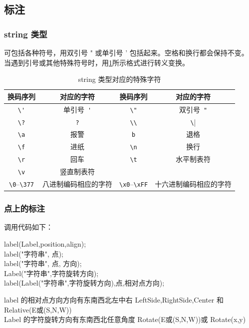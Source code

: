 \subsection{标注}
\subsubsection{string 类型}
可包括各种符号，用双引号 " 或单引号 ' 包括起来。空格和换行都会保持不变。
当遇到引号或其他特殊符号时，用\ref{markcode}所示格式进行转义变换。
\begin{table}[htb]
\centering
 \caption{ string 类型对应的特殊字符}\label{markcode}
 \begin{tabular}{cc|cc}
  \toprule
    \textbf{换码序列} & \textbf{对应的字符} & \textbf{换码序列} &
    \textbf{对应的字符}\\\midrule
    \verb|\'| & 单引号~\verb|'| & \verb|\"| & 双引号~\verb|"| \\
    \verb|\?| & \verb|?| & \verb|\\| & \verb|\| \\
    \verb|\a| & 报警 & \verb|b| & 退格 \\
    \verb|\f| & 进纸 & \verb|\n| & 换行 \\
    \verb|\r| & 回车 & \verb|\t| & 水平制表符 \\
    \verb|\v| & 竖直制表符 & & \\
    \verb|\0|--\verb|\377| & 八进制编码相应的字符 &
    \verb|\x0|--\verb|\xFF| & 十六进制编码相应的字符 \\
  \bottomrule
 \end{tabular}

\end{table}

\subsubsection{点上的标注}
调用代码如下：

\begin{asycmd}
label(Label,position,align);\\
label("字符串", 点);\\
label("字符串", 点, 方向);\\
Label("字符串",字符旋转方向);\\
label(Label("字符串",字符旋转方向),点,相对点方向);
\end{asycmd}
label 的相对点方向方向有东南西北左中右\textcolor[rgb]{0.00,0.50,0.25}{ LeftSide,RightSide,Center 和 Relative(E或(S,N,W))}\\
Label 的字符旋转方向有东南西北任意角度 \textcolor[rgb]{0.00,0.50,0.25}{Rotate(E或(S,N,W))或 Rotate(x,y)}\\

